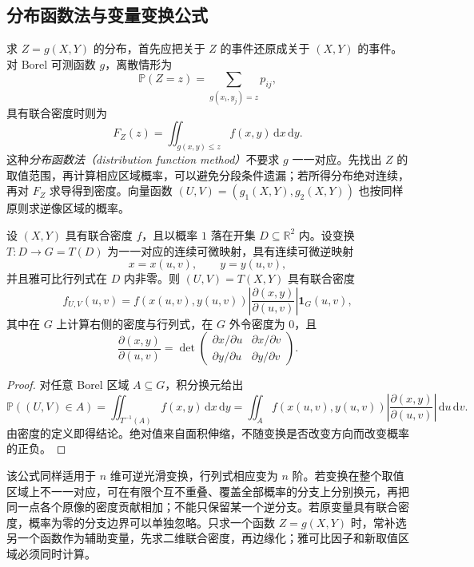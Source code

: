 \subsection{分布函数法与变量变换公式}

求 $Z=g(X,Y)$ 的分布，首先应把关于 $Z$ 的事件还原成关于 $(X,Y)$ 的事件。对 Borel 可测函数 $g$，离散情形为
\[
  \mathbb P(Z=z)=\sum_{g(x_i,y_j)=z}p_{ij},
\]
具有联合密度时则为
\begin{equation}
  F_Z(z)=\iint_{g(x,y)\le z}f(x,y)\,\mathrm dx\,\mathrm dy.
  \label{eq:study-ch3-vector-function-cdf}
\end{equation}
这种\emph{分布函数法（distribution function method）}不要求 $g$ 一一对应。先找出 $Z$ 的取值范围，再计算相应区域概率，可以避免分段条件遗漏；若所得分布绝对连续，再对 $F_Z$ 求导得到密度。向量函数 $(U,V)=(g_1(X,Y),g_2(X,Y))$ 也按同样原则求逆像区域的概率。

\begin{theorem}
\label{thm:study-ch3-jacobian-transform}
设 $(X,Y)$ 具有联合密度 $f$，且以概率 $1$ 落在开集 $D\subseteq\mathbb R^2$ 内。设变换 $T:D\to G=T(D)$ 为一一对应的连续可微映射，具有连续可微逆映射
\[
  x=x(u,v),\qquad y=y(u,v),
\]
并且雅可比行列式在 $D$ 内非零。则 $(U,V)=T(X,Y)$ 具有联合密度
\begin{equation}
  f_{U,V}(u,v)
  =f(x(u,v),y(u,v))
    \left|\frac{\partial(x,y)}{\partial(u,v)}\right|
    \boldsymbol 1_G(u,v),
  \label{eq:study-ch3-jacobian-density}
\end{equation}
其中在 $G$ 上计算右侧的密度与行列式，在 $G$ 外令密度为 $0$，且
\[
  \frac{\partial(x,y)}{\partial(u,v)}
  =\det\begin{pmatrix}
    \partial x/\partial u&\partial x/\partial v\\
    \partial y/\partial u&\partial y/\partial v
  \end{pmatrix}.
\]
\end{theorem}

\begin{proof}
对任意 Borel 区域 $A\subseteq G$，积分换元给出
\[
  \mathbb P((U,V)\in A)
  =\iint_{T^{-1}(A)}f(x,y)\,\mathrm dx\,\mathrm dy
  =\iint_A f(x(u,v),y(u,v))
    \left|\frac{\partial(x,y)}{\partial(u,v)}\right|
    \,\mathrm du\,\mathrm dv.
\]
由密度的定义即得结论。绝对值来自面积伸缩，不随变换是否改变方向而改变概率的正负。
\end{proof}

该公式同样适用于 $n$ 维可逆光滑变换，行列式相应变为 $n$ 阶。若变换在整个取值区域上不一一对应，可在有限个互不重叠、覆盖全部概率的分支上分别换元，再把同一点各个原像的密度贡献相加；不能只保留某一个逆分支。若原变量具有联合密度，概率为零的分支边界可以单独忽略。只求一个函数 $Z=g(X,Y)$ 时，常补选另一个函数作为辅助变量，先求二维联合密度，再边缘化；雅可比因子和新取值区域必须同时计算。

